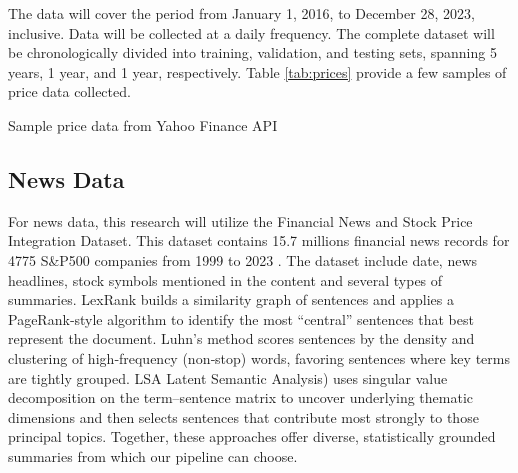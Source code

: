 The data will cover the period from January 1, 2016, to December 28, 2023, inclusive. Data will be collected at a daily frequency. The complete dataset will be chronologically divided into training, validation, and testing sets, spanning 5 years, 1 year, and 1 year, respectively. Table \ref{tab:prices} provide a few samples of price data collected.

\begin{table}
  \centering
  \caption{Sample price data from Yahoo Finance API}
  \label{tab:prices}
\end{table}

\subsection{News Data}
For news data, this research will utilize the Financial News and Stock Price Integration Dataset. This dataset contains 15.7 millions financial news records for 4775 S\&P500 companies from 1999 to 2023 \cite{Dong2024}. The dataset include date, news headlines, stock symbols mentioned in the content and several types of summaries. LexRank builds a similarity graph of sentences and applies a PageRank‐style algorithm to identify the most “central” sentences that best represent the document. Luhn's method scores sentences by the density and clustering of high‐frequency (non‐stop) words, favoring sentences where key terms are tightly grouped. \gls{LSA} Latent Semantic Analysis) uses singular value decomposition on the term–sentence matrix to uncover underlying thematic dimensions and then selects sentences that contribute most strongly to those principal topics. Together, these approaches offer diverse, statistically grounded summaries from which our pipeline can choose.

